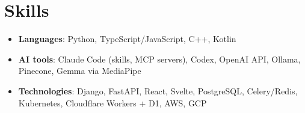 \documentclass[letterpaper,11pt]{article}
\newcommand{\resumeSubHeadingListStart}{\begin{itemize}[leftmargin=*]}
\newcommand{\resumeSubHeadingListEnd}{\end{itemize}}
\begin{document}
\section{Skills}
 \resumeSubHeadingListStart
   \item \small{\textbf{Languages}: Python, TypeScript/JavaScript, C++, Kotlin}
   \item \small{\textbf{AI tools}: Claude Code (skills, MCP servers), Codex, OpenAI API, Ollama, Pinecone, Gemma via MediaPipe}
   \item \small{\textbf{Technologies}: Django, FastAPI, React, Svelte, PostgreSQL, Celery/Redis, Kubernetes, Cloudflare Workers + D1, AWS, GCP}
 \resumeSubHeadingListEnd

\end{document}
